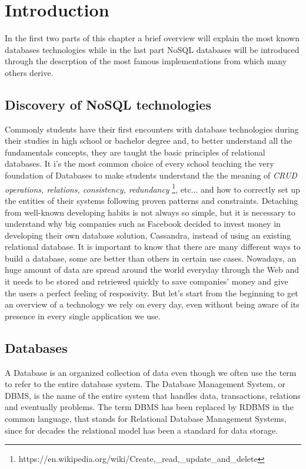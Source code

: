 \chapter{Introduction}
\label{cha:intro}

In the first two parts of this chapter a brief overview will explain the most known databases technologies while in the last part NoSQL databases will be introduced through the descrption of the most famous implementations from which many others derive.


\section{Discovery of NoSQL technologies}
\label{sec:context}

Commonly students have their first encounters with database technologies during their studies in high school or bachelor degree and, to better understand all the fundamentals concepts, they are taught the basic principles of relational databases.
It i’s the most common choice of every school teaching the very foundation of Databases to make students understand the the meaning of \textit{CRUD operations, relations, consistency, redundancy} \footnote{https://en.wikipedia.org/wiki/Create,\_read,\_update\_and\_delete}, etc... and how to correctly set up the entities of their systems following proven patterns and constraints.
Detaching from well-known developing habits is not always so simple, but it is necessary to understand why big companies such as Facebook decided to invest money in developing their own database solution, Cassandra, instead of using an existing relational database.
It is important to know that there are many different ways to build a database, some are better than others in certain use cases. Nowadays, an huge amount of data are spread around the world everyday through the Web and it needs to be stored and retriewed quickly to save companies' money and give the users a perfect feeling of resposivity.
But let’s start from the beginning to get an overview of a technology we rely on every day, even without being aware of its presence in every single application we use.


\cite{ictbusiness}
\cite{donoho}

\section{Databases}
\label{sec:problem}

A Database is an organized collection of data even though we often use the term to refer to the entire database system. The Database Management System, or DBMS, is the name of the entire system that handles data, transactions, relations and eventually problems.
The term DBMS has been replaced by RDBMS in the common language, that stands for Relational Database Management Systems, since for decades the relational model has been a standard for data storage.



